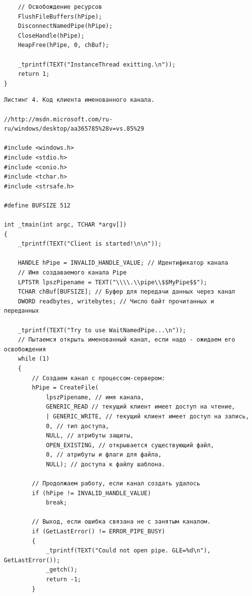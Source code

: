 \documentclass[a4paper,12pt]{article} %
\begin{document}
\begin{verbatim}
    // Освобождение ресурсов 
    FlushFileBuffers(hPipe);
    DisconnectNamedPipe(hPipe);
    CloseHandle(hPipe);
    HeapFree(hPipe, 0, chBuf);

    _tprintf(TEXT("InstanceThread exitting.\n"));
    return 1;
}
\end{verbatim}

\vspace{3em}

\begin{verbatim}
Листинг 4. Код клиента именованного канала.

//http://msdn.microsoft.com/ru-ru/windows/desktop/aa365785%28v=vs.85%29

#include <windows.h> 
#include <stdio.h>
#include <conio.h>
#include <tchar.h>
#include <strsafe.h>

#define BUFSIZE 512

int _tmain(int argc, TCHAR *argv[])
{
    _tprintf(TEXT("Client is started!\n\n"));

    HANDLE hPipe = INVALID_HANDLE_VALUE; // Идентификатор канала
    // Имя создаваемого канала Pipe
    LPTSTR lpszPipename = TEXT("\\\\.\\pipe\\$$MyPipe$$");
    TCHAR chBuf[BUFSIZE]; // Буфер для передачи данных через канал
    DWORD readbytes, writebytes; // Число байт прочитанных и переданных

    _tprintf(TEXT("Try to use WaitNamedPipe...\n"));
    // Пытаемся открыть именованный канал, если надо - ожидаем его освобождения
    while (1)
    {
        // Создаем канал с процессом-сервером:
        hPipe = CreateFile(
            lpszPipename, // имя канала,
            GENERIC_READ // текущий клиент имеет доступ на чтение,
            | GENERIC_WRITE, // текущий клиент имеет доступ на запись,
            0, // тип доступа,
            NULL, // атрибуты защиты,
            OPEN_EXISTING, // открывается существующий файл,
            0, // атрибуты и флаги для файла,
            NULL); // доступа к файлу шаблона.

        // Продолжаем работу, если канал создать удалось 
        if (hPipe != INVALID_HANDLE_VALUE)
            break;

        // Выход, если ошибка связана не с занятым каналом. 
        if (GetLastError() != ERROR_PIPE_BUSY)
        {
            _tprintf(TEXT("Could not open pipe. GLE=%d\n"), GetLastError());
            _getch();
            return -1;
        }


\end{verbatim}
\end{document}
